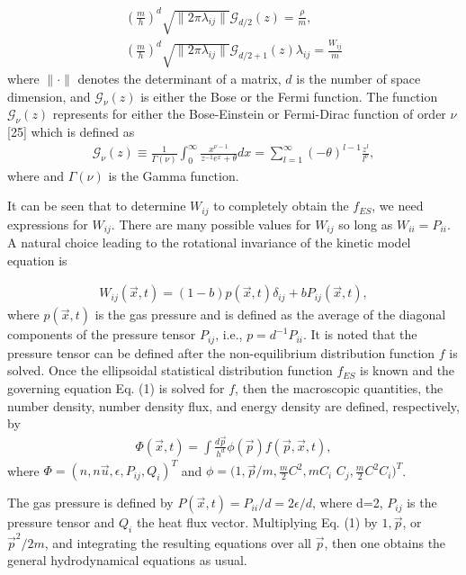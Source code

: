 \documentclass[doublecol]{epl2}
\begin{document}
\begin{align}
\left(\frac{m}{h}\right)^d \sqrt{ \|2 \pi \lambda_{i j}\| } \mathcal{G}_{d/2}(z) = \frac{\rho}{m}, \\
\left(\frac{m}{h}\right)^d \sqrt{ \|2 \pi \lambda_{i j}\| } \mathcal{G}_{d/2 +1}(z) \lambda_{i j} = \frac{W_{i j}}{m}
\end{align}
where $\| \cdot \|$ denotes the determinant of a matrix, $d$ is the number of space dimension, and $\mathcal{G}_{\nu}(z)$ is either the Bose or the Fermi function.  The function $\mathcal{G}_{\nu}(z)$ represents for either the Bose-Einstein or Fermi-Dirac function of order $\nu$ [25] which is defined as
\begin{align}
\mathcal{G}_{\nu}(z) \equiv \frac{1}{\Gamma(\nu)} \int^{\infty}_0 \frac{ x^{\nu
-1} }{ {z^{-1} e^x + \theta}}dx = \sum^{\infty}_{l=1}
(-\theta)^{l-1} \frac{z^l}{l^{\nu}},
\end{align}
where and $\Gamma(\nu)$ is the Gamma function.

It can be seen that to determine $W_{i j} $ to completely obtain the $f_{ES}$, we need expressions for $W_{i j} $.   There are many possible values for $W_{i j} $ so long as $W_{i i}=P_{i i}$.   A natural choice leading to the rotational invariance of the kinetic model equation is \cite{Holway1966}

\begin{align}
W_{i j}(\vec x, t) = (1 - b) p(\vec x, t) \delta_{i j} + b P_{i j}(\vec x, t),
\end{align}
where $p(\vec x, t)$ is the gas pressure and is defined as the average of the diagonal components of the pressure tensor $P_{i j}$, i.e., $p = d^{-1} P_{i i}$.
It is noted that the pressure tensor can be defined after the non-equilibrium distribution function $f$ is solved.   Once the ellipsoidal statistical distribution function $f_{ES}$ is known and the governing equation Eq. (1) is solved for $f$, then the macroscopic quantities, the number density, number density flux, and energy density are defined, respectively, by
\begin{align}
\Phi (\vec x, t) = \int \frac{d \vec p }{ h^d} \phi(\vec p) f(\vec p, \vec x, t),
\end{align}
where $\Phi = (n, n\vec u, \epsilon, P_{ij}, Q_{i})^T$ and $\phi = (1, \vec p/m, \frac{m}{2} C^2, m C_{i} $ $C_{j}, \frac{m}{2}C^2 C_{i} )^T$.

The gas pressure is defined by $P(\vec x, t) = P_{i i}/d = 2 \epsilon /d$, where d=2, $P_{ij}$ is the pressure tensor and $Q_{i}$ the heat flux vector.
Multiplying Eq. (1) by $1, \vec p$, or $\vec p^2/2m$, and integrating the resulting equations over all $\vec p$, then one obtains the general hydrodynamical equations as usual.
\end{document}
